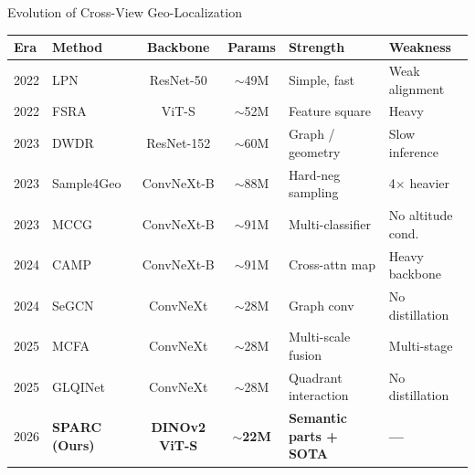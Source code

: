 \documentclass[aspectratio=169, 11pt]{beamer}
\begin{document}
\begin{frame}{Evolution of Cross-View Geo-Localization}
\footnotesize
\centering
\begin{tabular}{@{}l l c c l l@{}}
  \toprule
  \textbf{Era} & \textbf{Method} & \textbf{Backbone} & \textbf{Params} & \textbf{Strength} & \textbf{Weakness} \\
  \midrule
  2022 & LPN & ResNet-50 & $\sim$49M & Simple, fast & Weak alignment \\
  2022 & FSRA & ViT-S & $\sim$52M & Feature square & Heavy \\
  2023 & DWDR & ResNet-152 & $\sim$60M & Graph / geometry & Slow inference \\
  2023 & Sample4Geo & ConvNeXt-B & $\sim$88M & Hard-neg sampling & 4$\times$ heavier \\
  2023 & MCCG & ConvNeXt-B & $\sim$91M & Multi-classifier & No altitude cond. \\
  2024 & CAMP & ConvNeXt-B & $\sim$91M & Cross-attn map & Heavy backbone \\
  2024 & SeGCN & ConvNeXt & $\sim$28M & Graph conv & No distillation \\
  2025 & MCFA & ConvNeXt & $\sim$28M & Multi-scale fusion & Multi-stage \\
  2025 & GLQINet & ConvNeXt & $\sim$28M & Quadrant interaction & No distillation \\
  \midrule
  \rowcolor{successgreen!15}
  2026 & \textbf{SPARC (Ours)} & \textbf{DINOv2 ViT-S} & \textbf{$\sim$22M} & \textbf{Semantic parts + SOTA} & \textbf{---} \\
  \bottomrule
\end{tabular}
\end{frame}
\end{document}
